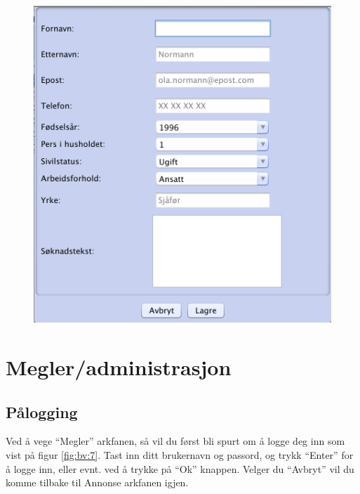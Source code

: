 \begin{figure}[h!]
\center
 \includegraphics[scale=0.7]{./img/brukerveiledning/6.png}
 \caption{}
 \label{fig:bv:6}
\end{figure}





\newpage
\section{Megler/administrasjon}

\subsection{Pålogging}

Ved å vege “Megler” arkfanen, så vil du først bli spurt om å logge deg inn som vist på figur \ref{fig:bv:7}.
Tast inn ditt brukernavn og passord, og trykk “Enter” for å logge inn, eller evnt. ved å trykke på “Ok”
knappen. Velger du “Avbryt” vil du komme tilbake til Annonse arkfanen igjen.

